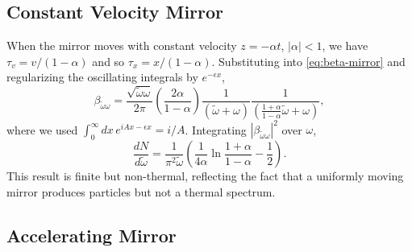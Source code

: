 \subsection*{Constant Velocity Mirror}

When the mirror moves with constant velocity $z = -\alpha t$,
$|\alpha| < 1$, we have $\tau_v = v/(1-\alpha)$ and so
$\tau_x = x/(1-\alpha)$. Substituting into \eqref{eq:beta-mirror} and
regularizing the oscillating integrals by $e^{-\epsilon x}$,
\begin{equation}
	\beta_{\tilde\omega\omega}
	= \frac{\sqrt{\tilde\omega\omega}}{2\pi}
	\left(\frac{2\alpha}{1-\alpha}\right)
	\frac{1}{(\tilde\omega+\omega)}
	\frac{1}{\left(\frac{1+\alpha}{1-\alpha}\tilde\omega
		+\omega\right)},
\end{equation}
where we used $\int_0^\infty dx\,e^{iAx-\epsilon x} = i/A$. Integrating
$|\beta_{\tilde\omega\omega}|^2$ over $\omega$,
\begin{equation}
	\boxed{\frac{dN}{d\tilde\omega}
		= \frac{1}{\pi^2\tilde\omega}\left(
		\frac{1}{4\alpha}\ln\frac{1+\alpha}{1-\alpha}
		- \frac{1}{2}\right).}
\end{equation}
This result is finite but non-thermal, reflecting the fact that a
uniformly moving mirror produces particles but not a thermal spectrum.

\subsection*{Accelerating Mirror}

